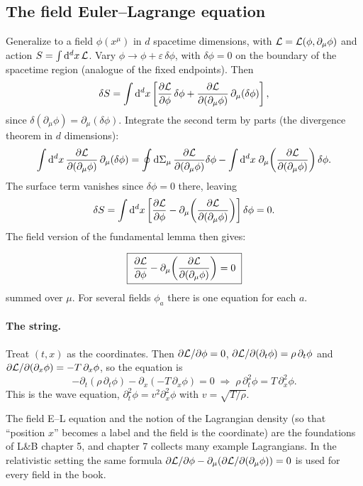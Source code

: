 \documentclass[11pt]{article}
\begin{document}
\subsection{The field Euler--Lagrange equation}

Generalize to a field $\phi(x^\mu)$ in $d$ spacetime dimensions, with $\mathcal{L}=\mathcal{L}(\phi,\partial_\mu\phi)$ and action $S=\int\mathrm{d}^dx\,\mathcal{L}$. Vary $\phi\to\phi+\varepsilon\,\delta\phi$, with $\delta\phi=0$ on the boundary of the spacetime region (analogue of the fixed endpoints). Then
\begin{equation}
  \delta S=\int\mathrm{d}^dx\left[\frac{\partial \mathcal{L}}{\partial \phi}\,\delta\phi+\frac{\partial \mathcal{L}}{\partial (\partial_\mu\phi)}\,\partial_\mu(\delta\phi)\right],
\end{equation}
since $\delta(\partial_\mu\phi)=\partial_\mu(\delta\phi)$. Integrate the second term by parts (the divergence theorem in $d$ dimensions):
\[
  \int\mathrm{d}^dx\,\frac{\partial \mathcal{L}}{\partial (\partial_\mu\phi)}\,\partial_\mu(\delta\phi)=\oint\mathrm{d}\Sigma_\mu\,\frac{\partial \mathcal{L}}{\partial (\partial_\mu\phi)}\delta\phi-\int\mathrm{d}^dx\;\partial_\mu\!\left(\frac{\partial \mathcal{L}}{\partial (\partial_\mu\phi)}\right)\delta\phi .
\]
The surface term vanishes since $\delta\phi=0$ there, leaving
\[
  \delta S=\int\mathrm{d}^dx\left[\frac{\partial \mathcal{L}}{\partial \phi}-\partial_\mu\!\left(\frac{\partial \mathcal{L}}{\partial (\partial_\mu\phi)}\right)\right]\delta\phi=0 .
\]
The field version of the fundamental lemma then gives:

\begin{keyresult}
\begin{equation}
  \boxed{\;\frac{\partial \mathcal{L}}{\partial \phi}-\partial_\mu\!\left(\frac{\partial \mathcal{L}}{\partial (\partial_\mu\phi)}\right)=0\;}
\end{equation}
summed over $\mu$. For several fields $\phi_a$ there is one equation for each $a$.
\end{keyresult}

\paragraph{The string.} Treat $(t,x)$ as the coordinates. Then $\partial\mathcal{L}/\partial\phi=0$, $\partial\mathcal{L}/\partial(\partial_t\phi)=\rho\,\partial_t\phi$ and $\partial\mathcal{L}/\partial(\partial_x\phi)=-T\,\partial_x\phi$, so the equation is
\[
  -\partial_t(\rho\,\partial_t\phi)-\partial_x(-T\,\partial_x\phi)=0\;\Longrightarrow\;\rho\,\partial_t^2\phi=T\,\partial_x^2\phi .
\]
This is the wave equation, $\partial_t^2\phi=v^2\partial_x^2\phi$ with $v=\sqrt{T/\rho}$.

\begin{qftbridge}
The field E--L equation and the notion of the Lagrangian density (so that ``position $x$'' becomes a label and the field is the coordinate) are the foundations of L\&B chapter 5, and chapter 7 collects many example Lagrangians. In the relativistic setting the same formula $\partial\mathcal{L}/\partial\phi-\partial_\mu(\partial\mathcal{L}/\partial(\partial_\mu\phi))=0$ is used for every field in the book.
\end{qftbridge}
\end{document}
